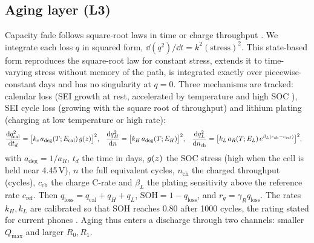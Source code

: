 \subsection{Aging layer (L3)}\label{sec:L3}
Capacity fade follows square-root laws in time or charge throughput \cite{SCH14,SCM18}. We integrate each loss
$q$ in squared form, $\dd(q^2)/\dd t=k^2(\text{stress})^2$. This state-based form reproduces the square-root law
for constant stress, extends it to time-varying stress without memory of the path, is integrated exactly over
piecewise-constant days and has no singularity at $q=0$. Three mechanisms are tracked: calendar loss (SEI growth
at rest, accelerated by temperature and high SOC \cite{KEIL16}), SEI cycle loss (growing with the square root of
throughput) and lithium plating (charging at low temperature or high rate):
\begin{align}
  \frac{\mathrm{d} q_{\mathrm{cal}}^2}{\mathrm{d} t_d}&=\big[k_c\,a_{\deg}(T;E_{\mathrm{cal}})\,g(z)\big]^2, &
  \frac{\mathrm{d} q_H^2}{\mathrm{d} n}&=\big[k_H\,a_{\deg}(T;E_H)\big]^2, &
  \frac{\mathrm{d} q_L^2}{\mathrm{d} n_{\mathrm{ch}}}&=\big[k_L\,a_R(T;E_L)\,e^{\beta_L(c_{\mathrm{ch}}-c_{\mathrm{ref}})}\big]^2, \label{eq:aging}
\end{align}
with $a_{\deg}=1/a_R$, $t_d$ the time in days, $g(z)$ the SOC stress (high when the cell is held near 4.45\,V),
$n$ the full equivalent cycles, $n_{\mathrm{ch}}$ the charged throughput (cycles), $c_{\mathrm{ch}}$ the charge
C-rate and $\beta_L$ the plating sensitivity above the reference rate $c_{\mathrm{ref}}$. Then
$q_{\mathrm{loss}}=q_{\mathrm{cal}}+q_H+q_L$, $\mathrm{SOH}=1-q_{\mathrm{loss}}$, and $r_g=\gamma_Rq_{\mathrm{loss}}$.
The rates $k_H,k_L$ are calibrated so that SOH reaches 0.80 after 1000 cycles, the rating stated for current
phones \cite{AP-BATT,GOOG}. Aging thus enters a discharge
through two channels: smaller $Q_{\max}$ and larger $R_0,R_1$.

